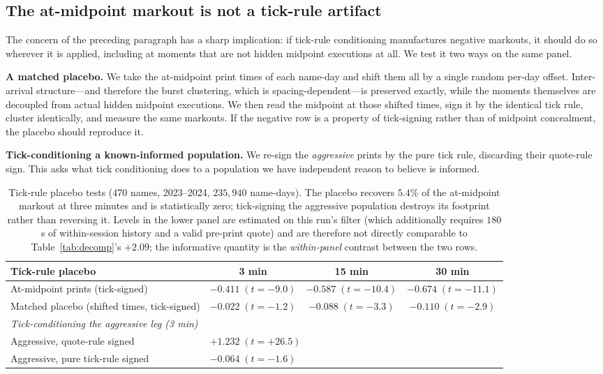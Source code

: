 \documentclass[11pt]{article}
\begin{document}
\subsection{The at-midpoint markout is not a tick-rule artifact}
\label{sec:tickplacebo}

The concern of the preceding paragraph has a sharp implication: if tick-rule conditioning
manufactures negative markouts, it should do so wherever it is applied, including at moments
that are not hidden midpoint executions at all. We test it two ways on the same panel.

\textbf{A matched placebo.} We take the at-midpoint print times of each name-day and shift
them all by a single random per-day offset. Inter-arrival structure---and therefore the burst
clustering, which is spacing-dependent---is preserved exactly, while the moments themselves
are decoupled from actual hidden midpoint executions. We then read the midpoint at those
shifted times, sign it by the identical tick rule, cluster identically, and measure the same
markouts. If the negative row is a property of tick-signing rather than of midpoint
concealment, the placebo should reproduce it.

\textbf{Tick-conditioning a known-informed population.} We re-sign the \emph{aggressive}
prints by the pure tick rule, discarding their quote-rule sign. This asks what tick
conditioning does to a population we have independent reason to believe is informed.

\begin{table}[htbp]
\centering
\begin{tabular}{lccc}
\toprule
\textbf{Tick-rule placebo} & \textbf{3 min} & \textbf{15 min} & \textbf{30 min} \\
\midrule
At-midpoint prints (tick-signed) & $-0.411\;(t{=}{-}9.0)$ & $-0.587\;(t{=}{-}10.4)$ & $-0.674\;(t{=}{-}11.1)$ \\
Matched placebo (shifted times, tick-signed) & $-0.022\;(t{=}{-}1.2)$ & $-0.088\;(t{=}{-}3.3)$ & $-0.110\;(t{=}{-}2.9)$ \\
\midrule
\multicolumn{4}{l}{\emph{Tick-conditioning the aggressive leg (3 min)}} \\
\quad Aggressive, quote-rule signed & \multicolumn{3}{l}{$+1.232\;(t{=}{+}26.5)$} \\
\quad Aggressive, pure tick-rule signed & \multicolumn{3}{l}{$-0.064\;(t{=}{-}1.6)$} \\
\bottomrule
\end{tabular}
\caption{Tick-rule placebo tests (470 names, 2023--2024, $235{,}940$ name-days). The placebo
recovers $5.4\%$ of the at-midpoint markout at three minutes and is statistically zero;
tick-signing the aggressive population destroys its footprint rather than reversing it.
Levels in the lower panel are estimated on this run's filter (which additionally requires
$180$s of within-session history and a valid pre-print quote) and are therefore not directly
comparable to Table~\ref{tab:decomp}'s $+2.09$; the informative quantity is the
\emph{within-panel} contrast between the two rows.}
\label{tab:tickplacebo}
\end{table}
\end{document}
